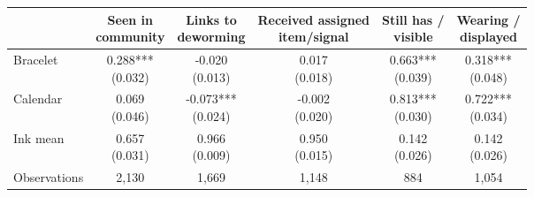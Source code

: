 \centering
    \begin{tabular}[t]{lccccc}
    \toprule
     & \makecell[c]{Seen in\\community}
     & \makecell[c]{Links to\\deworming}
     & \makecell[c]{Received assigned\\item/signal}
     & \makecell[c]{Still has /\\visible}
     & \makecell[c]{Wearing /\\displayed} \\
    \midrule
    Bracelet 
      & \makecell[c]{0.288***\\(0.032)} 
      & \makecell[c]{-0.020\\(0.013)} 
      & \makecell[c]{0.017\\(0.018)} 
      & \makecell[c]{0.663***\\(0.039)} 
      & \makecell[c]{0.318***\\(0.048)}\\
    Calendar 
      & \makecell[c]{0.069\\(0.046)} 
      & \makecell[c]{-0.073***\\(0.024)} 
      & \makecell[c]{-0.002\\(0.020)} 
      & \makecell[c]{0.813***\\(0.030)} 
      & \makecell[c]{0.722***\\(0.034)}\\
    \midrule
    Ink mean 
      & \makecell[c]{0.657\\(0.031)} 
      & \makecell[c]{0.966\\(0.009)} 
      & \makecell[c]{0.950\\(0.015)} 
      & \makecell[c]{0.142\\(0.026)} 
      & \makecell[c]{0.142\\(0.026)}\\
    Observations 
      & 2{,}130 
      & 1{,}669 
      & 1{,}148 
      & 884 
      & 1{,}054\\
    \bottomrule
    \end{tabular}
